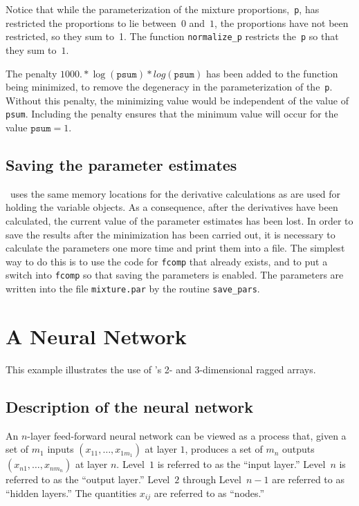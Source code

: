 \documentclass{admbmanual}
\begin{document}
Notice that while the parameterization of the mixture proportions,~\texttt{p},
has restricted the proportions to lie between~$0$ and~$1$, the proportions have
not been restricted, so they sum to~1. The function \texttt{normalize\_p}
restricts the~\texttt{p} so that they sum to~$1$.

The penalty $1000.*\log(\texttt{psum})*log(\texttt{psum})$ has been added to the
function being minimized, to remove the degeneracy in the parameterization of
the~\texttt{p}. Without this penalty, the minimizing value would be independent
of the value of \texttt{psum}. Including the penalty ensures that the minimum
value will occur for the value $\texttt{psum}=1$.

\section{Saving the parameter estimates}

\scAD\ uses the same memory locations for the derivative calculations as are
used for holding the variable objects. As a consequence, after the derivatives
have been calculated, the current value of the parameter estimates has been
lost. In order to save the results after the minimization has been carried out,
it is necessary to calculate the parameters one more time and print them into a
file. The simplest way to do this is to use the code for \texttt{fcomp} that
already exists, and to put a switch into \texttt{fcomp} so that saving the
parameters is enabled. The parameters are written into the file
\texttt{mixture.par} by the routine \texttt{save\_pars}.



\chapter{A Neural Network}\label{ch:neural-networks}

This example illustrates the use of \scAD\thinspace's 2- and 3-dimensional
ragged arrays.

\section{Description of the neural network}
\label{sec:description-nn}

An $n$-layer feed-forward neural network can be viewed as a process that, given
a set of $m_1$ inputs $(x_{11},\ldots,x_{1m_1})$ at layer $1$, produces a set of
$m_n$ outputs $(x_{n1},\ldots,x_{nm_n})$ at layer $n$. Level~$1$ is referred to
as the ``input layer.'' Level~$n$ is referred to as the ``output layer.''
Level~$2$ through Level~$n-1$ are referred to as ``hidden layers.'' The
quantities $x_{ij}$ are referred to as ``nodes.''
\end{document}
